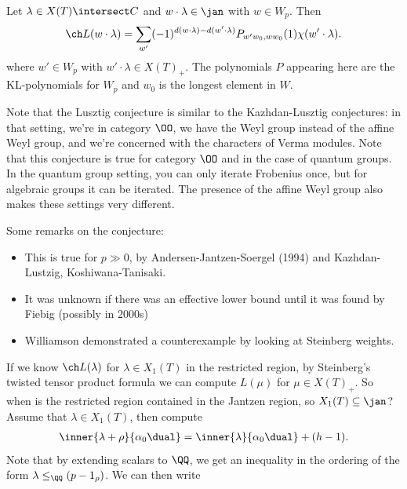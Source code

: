 \begin{proposition}

Let \(\lambda \in X(T) \intersect C\) and \(w\cdot\lambda \in \jan\)
with \(w\in W_p\). Then
\begin{align*}  
\ch L(w\cdot \lambda) = \sum_{w'} (-1)^{d(w\cdot \lambda) - d(w'\cdot \lambda)} P_{w'w_0, ww_0} (1) \chi(w'\cdot \lambda)
.\end{align*} where \(w'\in W_p\) with \(w'\cdot\lambda \in X(T)_+\).
The polynomials \(P\) appearing here are the KL-polynomials for \(W_p\)
and \(w_0\) is the longest element in \(W\).

\end{proposition}

\begin{remark}

Note that the Lusztig conjecture is similar to the Kazhdan-Lusztig
conjectures: in that setting, we're in category \(\OO\), we have the
Weyl group instead of the affine Weyl group, and we're concerned with
the characters of Verma modules. Note that this conjecture is true for
category \(\OO\) and in the case of quantum groups. In the quantum group
setting, you can only iterate Frobenius once, but for algebraic groups
it can be iterated. The presence of the affine Weyl group also makes
these settings very different.

\end{remark}

\begin{remark}

Some remarks on the conjecture:

\begin{itemize}
\item
  This is true for \(p\gg 0\), by Andersen-Jantzen-Soergel (1994) and
  Kazhdan-Lustzig, Koshiwana-Tanisaki.
\item
  It was unknown if there was an effective lower bound until it was
  found by Fiebig (possibly in 2000s)
\item
  Williamson demonstrated a counterexample by looking at Steinberg
  weights.
\end{itemize}

\end{remark}

If we know \(\ch L(\lambda)\) for \(\lambda \in X_1(T)\) in the
restricted region, by Steinberg's twisted tensor product formula we can
compute \(L(\mu)\) for \(\mu \in X(T)_+\). So when is the restricted
region contained in the Jantzen region, so \(X_1(T) \subseteq \jan\)?
Assume that \(\lambda \in X_1(T)\), then compute
\begin{align*}  
\inner{\lambda+\rho}{\alpha_0\dual} = \inner{\lambda}{\alpha_0\dual} + (h-1)
.\end{align*} Note that by extending scalars to \(\QQ\), we get an
inequality in the ordering of the form \(\lambda \leq_\QQ (p-1_\rho)\).
We can then write

